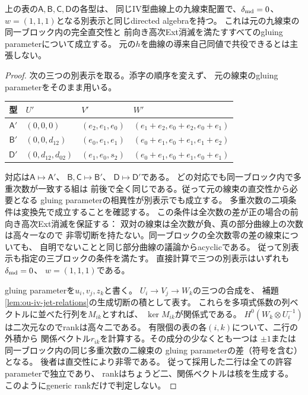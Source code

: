 \begin{proposition}
\label{prop:ou-iv-negative-relation-matches}
上の表の$\mathsf A,\mathsf B,\mathsf C,\mathsf D$の各型は、
同じIV型曲線上の九線束配置で、$\delta_{\rm md}=0$、
$w=(1,1,1)$となる別表示と同じdirected algebraを持つ。
これは元の九線束の同一ブロック内の完全直交性と
前向き高次Ext消滅を満たすすべてのgluing parameterについて成立する。
元の$h$を曲線の導来自己同値で共役できるとは主張しない。
\end{proposition}
\begin{proof}
次の三つの別表示を取る。添字の順序を変えず、
元の線束のgluing parameterをそのまま用いる。
\begin{center}
\small
\begin{tabular}{clll}
\toprule
型 & $U'$ & $V'$ & $W'$\\
\midrule
$\mathsf A'$ & $(0,0,0)$ & $(e_2,e_1,e_0)$ &
 $(e_1+e_2,e_0+e_2,e_0+e_1)$\\
$\mathsf B'$ & $(0,0,d_{12})$ & $(e_0,e_1,e_1)$ &
 $(e_0+e_1,e_0+e_1,e_1+e_2)$\\
$\mathsf D'$ & $(0,d_{12},d_{02})$ & $(e_1,e_0,s_2)$ &
 $(e_0+e_1,e_0+e_1,e_0+e_1)$\\
\bottomrule
\end{tabular}
\end{center}
対応は$\mathsf A\mapsto\mathsf A'$、
$\mathsf B,\mathsf C\mapsto\mathsf B'$、
$\mathsf D\mapsto\mathsf D'$である。
どの対応でも同一ブロック内で多重次数が一致する組は
前後で全く同じである。従って元の線束の直交性から必要となる
gluing parameterの相異性が別表示でも成立する。
多重次数の二項条件は変換先で成立することを確認する。
この条件は全次数の差が正の場合の前向き高次Ext消滅を保証する：
双対の線束は全次数が負、真の部分曲線上の次数は高々一なので
非零切断を持たない。同一ブロックの全次数零の差の線束についても、
自明でないことと同じ部分曲線の議論からacyclicである。
従って別表示も指定の三ブロックの条件を満たす。
直接計算で三つの別表示はいずれも$\delta_{\rm md}=0$、
$w=(1,1,1)$である。

gluing parameterを$u_i,v_j,z_k$と書く。
$U_i\to V_j\to W_k$の三つの合成を、
補題\ref{lem:ou-iv-jet-relations}の生成切断の積として表す。
これらを多項式係数の列ベクトルに並べた行列を$M_{ik}$とすれば、
$\ker M_{ik}$が関係式である。
$H^0(W_k\otimes U_i^{-1})$は二次元なのでrankは高々二である。
有限個の表の各$(i,k)$について、二行の外積から
関係ベクトル$r_{ik}$を計算する。その成分の少なくとも一つは
$\pm1$または同一ブロック内の同じ多重次数の二線束の
gluing parameterの差（符号を含む）となる。
後者は直交性により非零である。
従って採用した二行は全ての許容parameterで独立であり、
rankはちょうど二、関係ベクトルは核を生成する。
このようにgeneric rankだけで判定しない。


\end{proof}
